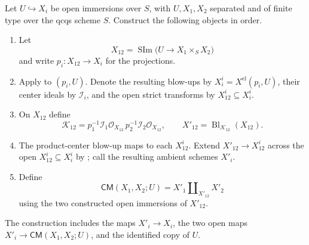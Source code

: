 \begin{definition}
  \label{def:nagata-common-modification}
  \leanok

  Let $U\hookrightarrow X_i$ be open immersions over $S$, with
  $U,X_1,X_2$ separated and of finite type over the qcqs scheme $S$.
  Construct the following objects in order.
  \begin{enumerate}
    \item Let
      \[
        X_{12}=\operatorname{SIm}
        \bigl(U\longrightarrow X_1\times_SX_2\bigr)
      \]
      and write $p_i\colon X_{12}\to X_i$ for the projections.
    \item Apply  to $(p_i,U)$.
      Denote the resulting blow-ups by
      $X_i^i= X^{\mathrm{el}}(p_i,U)$, their center ideals by
      $\mathcal I_i$, and the open strict transforms by
      $X_{12}^i\subseteq X_i^i$.
    \item On $X_{12}$ define
      \[
        \mathcal K_{12}
          =p_1^{-1}\mathcal I_1\mathcal O_{X_{12}}\,
           p_2^{-1}\mathcal I_2\mathcal O_{X_{12}},
        \qquad
        X'_{12}=\operatorname{Bl}_{\mathcal K_{12}}(X_{12}).
      \]
    \item The product-center blow-up maps to each $X_{12}^i$.  Extend
      $X'_{12}\to X_{12}^i$ across the open
      $X_{12}^i\subseteq X_i^i$ by
      ; call the resulting
      ambient schemes $X'_i$.
    \item Define
      \[
        \mathsf{CM}(X_1,X_2;U)=X'_1\amalg_{X'_{12}}X'_2
      \]
      using the two constructed open immersions of $X'_{12}$.
  \end{enumerate}
  The construction includes the maps $X'_i\to X_i$, the two open maps
  $X'_i\to\mathsf{CM}(X_1,X_2;U)$, and the identified copy of $U$.


\end{definition}
